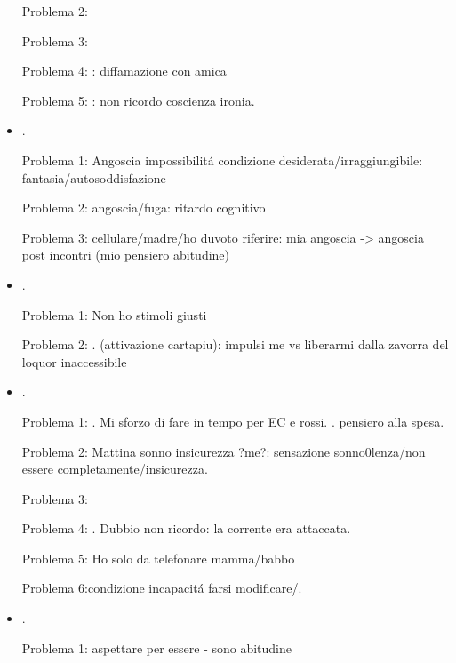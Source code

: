 \begin{itemize}
Problema 2: 

Problema 3: 

Problema 4: : diffamazione con amica

Problema 5: : non ricordo coscienza ironia. 

\item {}.

Problema 1: Angoscia impossibilit\'a condizione desiderata/irraggiungibile: fantasia/autosoddisfazione

Problema 2: angoscia/fuga: ritardo cognitivo 

Problema 3: cellulare/madre/ho duvoto riferire: mia angoscia -> angoscia post incontri (mio pensiero abitudine) 


\item {}.

Problema 1: Non ho stimoli giusti 

Problema 2: . (attivazione cartapiu): impulsi me vs liberarmi dalla zavorra del loquor inaccessibile


\item {}.

Problema 1: . Mi sforzo di fare in tempo per EC e rossi. . pensiero alla spesa.

Problema 2: Mattina sonno insicurezza ?me?: sensazione sonno0lenza/non essere completamente/insicurezza.

Problema 3: 

Problema 4: . Dubbio non ricordo: la corrente era attaccata.

Problema 5: Ho solo da telefonare mamma/babbo

Problema 6:condizione incapacit\'a farsi modificare/.


\item {}.

Problema 1: aspettare per essere - sono abitudine


\end{itemize}
